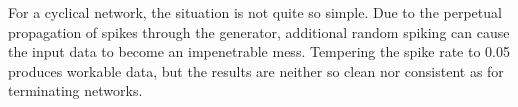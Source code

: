 \noindent For a cyclical network, the situation is not quite so simple. Due to 
the perpetual propagation of spikes through the generator, additional random 
spiking can cause the input data to become an impenetrable mess. Tempering the 
spike rate to 0.05 produces workable data, but the results are neither so clean 
nor
consistent as for terminating networks.  


